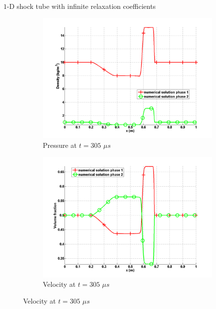 \documentclass[xcolor=dvipsnames,10pt]{beamer}
\begin{document}
\begin{frame}{$1$-D shock tube with infinite relaxation coefficients}
\begin{figure}
        \begin{subfigure}[b]{0.37\textwidth}
                \centering
                \includegraphics[width=\textwidth]{../figures/SEM/relaxation_two_phases_density.png}
                \caption{Pressure at $t=305$ $\mu s$}
        \end{subfigure}%
        \begin{subfigure}[b]{0.37\textwidth}
                \centering
                \includegraphics[width=\textwidth]{../figures/SEM/relaxation_two_phases_volume_fraction.png}
                \caption{Velocity at $t=305$ $\mu s$}
        \end{subfigure}%
\end{figure}
\end{frame}
\end{document}
